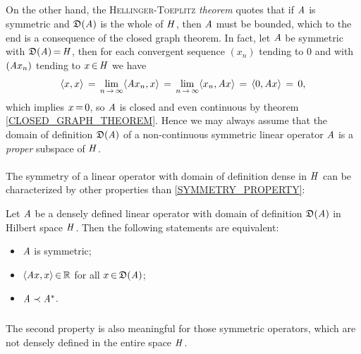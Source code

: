 \documentclass[11pt,twoside]{article}
\begin{document}
\subparagraph*{}
On the other hand,
the \textsc{Hellinger-Toeplitz} \textit{theorem} quotes
that if $\mathit{A}$ is symmetric and $\mathfrak{D}(\mathit{A})$ is the whole of $\mathit{H}$,
then $\mathit{A}$ must be bounded,
which to the end is a consequence of the {closed graph theorem}.
In fact,
let $\mathit{A}$ be symmetric with $\mathfrak{D}(\mathit{A}) {\,=\,} \mathit{H}$,
then for each convergent sequence $(x_n)$ tending to $0$
and with $(\mathit{A} x_n)$ tending to $x {\,\in\,} \mathit{H}$ 
we have
\[ 
                    \langle x,x \rangle       \,=\, 
\lim_{n {\,\to\,} \infty} \langle \mathit{A} x_n,x \rangle       \,=\,
\lim_{n {\,\to\,} \infty} \langle x_n,\mathit{A} x \rangle \,=\, 
                    \langle 0,\mathit{A} x \rangle \,=\, 0,
\]
which implies $x {\,=\,} 0$, so $\mathit{A}$ is closed 
and even continuous by theorem \ref{CLOSED_GRAPH_THEOREM}.
Hence we may always assume
that the domain of definition $\mathfrak{D}(\mathit{A})$
of a non-continuous symmetric linear operator $\mathit{A}$
is a \textit{proper} subspace of $\mathit{H}$.

\paragraph*{}
The symmetry of a linear operator with domain of definition dense in $\mathit{H}$
can be characterized by other properties than \eqref{SYMMETRY_PROPERTY}:

\begin{theorem}
Let $\mathit{A}$ be a densely defined linear operator with domain of definition
$\mathfrak{D}(\mathit{A})$ in Hilbert space $\mathit{H}$.
Then the following statements are equivalent:

\begin{itemize}[leftmargin=12pt]
\item[1.]
$\mathit{A}$ is symmetric;
\item[2.]
$\langle \mathit{A} x,x \rangle {\,\in\,} {\mathbb{R}}$ for all $x {\,\in\,} \mathfrak{D}(\mathit{A})$;
\item[3.]
$\mathit{A} \prec \mathit{A}^*$.
\end{itemize}
\end{theorem}

\subparagraph*{}
The second property is also meaningful for those symmetric operators,
which are not densely defined in the entire space $\mathit{H}$.
\end{document}
